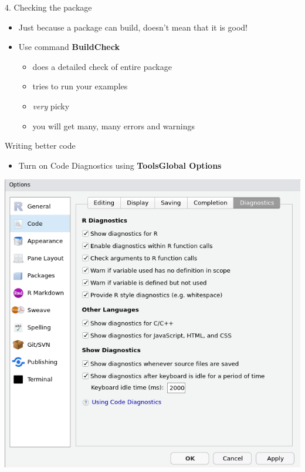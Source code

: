\documentclass[
  ignorenonframetext,
  aspectratio=169]{beamer}
\providecommand{\tightlist}{%
  \setlength{\itemsep}{0pt}\setlength{\parskip}{0pt}}
\begin{document}
\begin{frame}{4. Checking the package}
\protect\hypertarget{checking-the-package}{}
\begin{itemize}
\tightlist
\item
  Just because a package can build, doesn't mean that it is good!
\item
  Use command \textbf{Build\textbar Check}

  \begin{itemize}
  \tightlist
  \item
    does a detailed check of entire package
  \item
    tries to run your examples
  \item
    \emph{very} picky
  \item
    you will get many, many errors and warnings
  \end{itemize}
\end{itemize}
\end{frame}

\begin{frame}{Writing better code}
\protect\hypertarget{writing-better-code}{}
\begin{itemize}
\tightlist
\item
  Turn on Code Diagnostics using \textbf{Tools\textbar Global Options}
\end{itemize}

\includegraphics{figures/diagnostics.png}
\end{frame}
\end{document}
